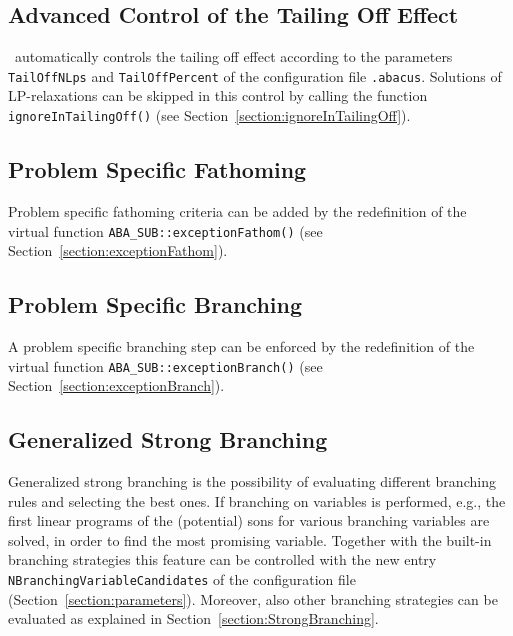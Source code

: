\subsection{Advanced Control of the Tailing Off Effect}

\ABACUS\ automatically controls the tailing off effect according to the
parameters {\tt TailOffNLps} and {\tt TailOffPercent} of the
configuration file {\tt .abacus}. Solutions of LP-relaxations can be
skipped in this control by calling the function {\tt
  ignoreInTailingOff()}
(see Section~\ref{section:ignoreInTailingOff}).


\subsection{Problem Specific Fathoming}

Problem specific fathoming criteria can be added by the redefinition 
of the virtual function 
{\tt ABA\_SUB::ex\-cep\-tion\-Fathom()} (see
Section~\ref{section:exceptionFathom}).

\subsection{Problem Specific Branching}

A problem specific branching step can be enforced by the redefinition
of the virtual function 
{\tt ABA\_SUB::ex\-cep\-tion\-Branch()} (see Section~\ref{section:exceptionBranch}).

\subsection{Generalized Strong Branching}

Generalized strong branching is the possibility of evaluating
different branching rules and selecting the best ones. If
branching on variables is performed, e.g., the first linear programs of the
(potential) sons for various branching 
variables are solved, in order to find the
most promising variable. Together with the built-in branching strategies
this feature can be controlled with the new entry 
{\tt NBranch\-ing\-Vari\-able\-Can\-di\-dates} of the configuration file 
(Section~\ref{section:parameters}).
Moreover, also other branching strategies can be evaluated as
explained in Section~\ref{section:StrongBranching}.
        

